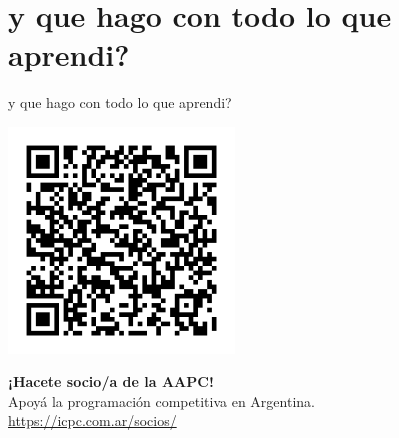 \documentclass{beamer}
\begin{document}
\section{y que hago con todo lo que aprendi?}

\begin{frame}{y que hago con todo lo que aprendi?}
    \begin{center}
        \includegraphics[width=0.45\textwidth,keepaspectratio]{img/qr-code-aapc.png}

        \vspace{0.5cm}
        {\small
        \textbf{¡Hacete socio/a de la AAPC!}\\
        Apoyá la programación competitiva en Argentina.\\
        \href{https://icpc.com.ar/socios/}{https://icpc.com.ar/socios/}
        }
    \end{center}
\end{frame}
\end{document}
